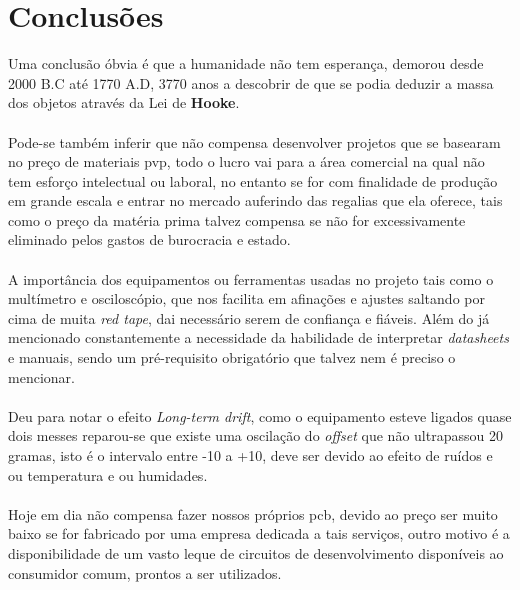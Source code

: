 \chapter{Conclusões}
Uma conclusão óbvia é que a humanidade não tem esperança, demorou desde 2000 B.C até 1770 A.D, 3770 anos a descobrir de que se podia deduzir a massa dos objetos através da Lei de \textbf{Hooke}.
\\
\\
Pode-se também inferir que não compensa desenvolver projetos que se basearam no preço de materiais \ac{pvp}, todo o lucro vai para a área comercial na qual não tem esforço intelectual ou laboral, no entanto se for com finalidade de produção em grande escala e entrar no mercado auferindo das regalias que ela oferece, tais como o preço da matéria prima talvez compensa se não for excessivamente eliminado pelos gastos de burocracia e estado.
\\
\\
A importância dos equipamentos ou ferramentas usadas no projeto tais como o multímetro e osciloscópio, que nos facilita em afinações e ajustes saltando por cima de muita \textit{red tape}, dai necessário serem de confiança e fiáveis. Além do já mencionado constantemente a necessidade da habilidade de interpretar \textit{datasheets} e manuais, sendo um pré-requisito obrigatório que talvez nem é preciso o mencionar.
\\
\\
Deu para notar o efeito \textit{Long-term drift}, como o equipamento esteve ligados quase dois messes reparou-se que existe uma oscilação do \textit{offset} que não ultrapassou 20 gramas, isto é o intervalo entre -10 a +10, deve ser devido ao efeito de ruídos e ou temperatura e ou humidades.
\\
\\
Hoje em dia não compensa fazer nossos próprios \ac{pcb}, devido ao preço ser muito baixo se for fabricado por uma empresa dedicada a tais serviços, outro motivo é a disponibilidade  de um vasto leque de circuitos de desenvolvimento disponíveis ao consumidor comum, prontos a ser utilizados.
